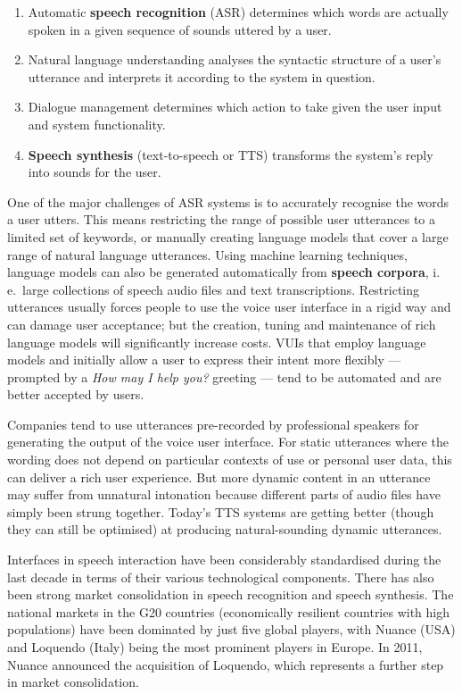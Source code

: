 {\begin{multicols}{2}
\begin{enumerate}
\item Automatic \textbf{speech recognition} (ASR) determines which words are actually spoken in a given sequence of sounds uttered by a user.
\item Natural language understanding analyses the syntactic structure of a user’s utterance and interprets it according to the system in question.
\item  Dialogue management determines which action to take given the user input and system functionality.
\item \textbf{Speech synthesis} (text-to-speech or TTS) transforms the system’s reply into sounds for the user. 
\end{enumerate}
One of the major challenges of ASR systems is to accurately recognise the words a user utters. This means restricting the range of possible user utterances to a limited set of keywords, or manually creating language models that cover a large range of natural language utterances. Using machine learning techniques, language models can also be generated automatically from \textbf{speech corpora}, i.\,e.~large collections of speech audio files and text transcriptions. Restricting utterances usually forces people to use the voice user interface in a rigid way and can damage user acceptance; but the creation, tuning and maintenance of rich language models will significantly increase costs. VUIs that employ language models and initially allow a user to express their intent more flexibly — prompted by a \textit{How may I help you?} greeting — tend to be automated and are better accepted by users. 


Companies tend to use utterances pre-recorded by professional speakers for generating the output of the voice user interface. For static utterances where the wording does not depend on particular contexts of use or personal user data, this can deliver a rich user experience. But more dynamic content in an utterance may suffer from unnatural intonation because different parts of audio files have simply been strung together. Today’s TTS systems are getting better (though they can still be optimised) at producing natural-sounding dynamic utterances.  


Interfaces in speech interaction have been considerably standardised during the last decade in terms of their various technological components. There has also been strong market consolidation in speech recognition and speech synthesis. The national markets in the G20 countries (economically resilient countries with high populations) have been dominated by just five global players, with Nuance (USA) and Loquendo (Italy) being the most prominent players in Europe. In 2011, Nuance announced the acquisition of Loquendo, which represents a further step in market consolidation.


\end{multicols}}
